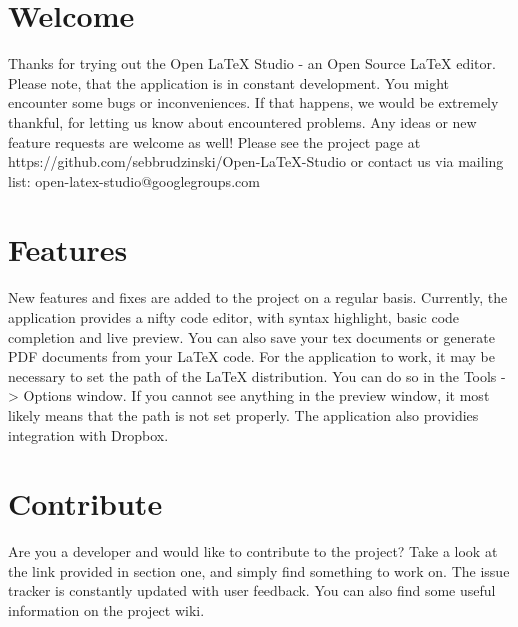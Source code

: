 \documentclass[12pt]{article}
\title{Open \LaTeX{} Studio - ${pom.version} version}
\date{}
\author{Sebastian Brudzinski}
\begin{document}
  \maketitle
  \section{Welcome}
  Thanks for trying out the Open \LaTeX{} Studio - an Open Source \LaTeX{} editor. Please note, that the
  application is in constant development. You might encounter some bugs or inconveniences. If that happens, 
  we would be extremely thankful, for letting us know about encountered problems. Any ideas or new feature
  requests are welcome as well! Please see the project page at 
  https://github.com/sebbrudzinski/Open-LaTeX-Studio
  or contact us via mailing list: open-latex-studio@googlegroups.com

  \section{Features}
  New features and fixes are added to the project on a regular basis. Currently, the application provides
  a nifty code editor, with syntax highlight, basic code completion and live preview. You can also save your tex 
  documents or generate PDF documents from your \LaTeX{} code. For the application to work, it may be necessary to 
  set the path of the LaTeX distribution. You can do so in the Tools -> Options window. If you cannot see anything in the preview window, it most likely means that
  the path is not set properly. The application also providies integration with Dropbox. 

  \section{Contribute}
  Are you a developer and would like to contribute to the project? Take a look at the link provided in section one, 
  and simply find something to work on. The issue tracker is constantly updated with user feedback. You can also
  find some useful information on the project wiki.
\end{document}
